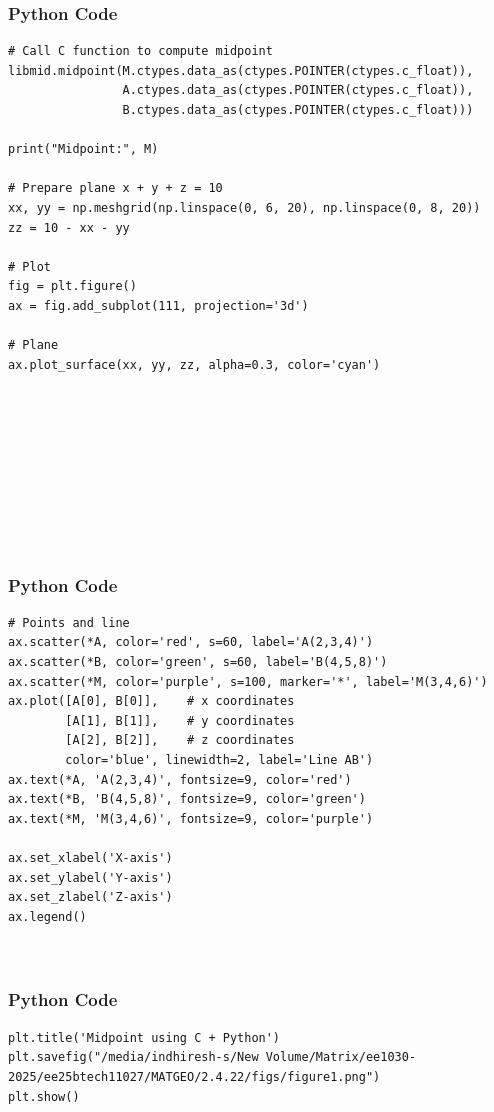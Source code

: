 \documentclass{beamer}
\begin{document}
\begin{frame}[fragile]
    \frametitle{Python Code}
    \begin{lstlisting}
# Call C function to compute midpoint
libmid.midpoint(M.ctypes.data_as(ctypes.POINTER(ctypes.c_float)),
                A.ctypes.data_as(ctypes.POINTER(ctypes.c_float)),
                B.ctypes.data_as(ctypes.POINTER(ctypes.c_float)))

print("Midpoint:", M)

# Prepare plane x + y + z = 10
xx, yy = np.meshgrid(np.linspace(0, 6, 20), np.linspace(0, 8, 20))
zz = 10 - xx - yy

# Plot
fig = plt.figure()
ax = fig.add_subplot(111, projection='3d')

# Plane
ax.plot_surface(xx, yy, zz, alpha=0.3, color='cyan')










    \end{lstlisting}
\end{frame}

\begin{frame}[fragile]
    \frametitle{Python Code}

    \begin{lstlisting}
# Points and line
ax.scatter(*A, color='red', s=60, label='A(2,3,4)')
ax.scatter(*B, color='green', s=60, label='B(4,5,8)')
ax.scatter(*M, color='purple', s=100, marker='*', label='M(3,4,6)')
ax.plot([A[0], B[0]],    # x coordinates
        [A[1], B[1]],    # y coordinates
        [A[2], B[2]],    # z coordinates
        color='blue', linewidth=2, label='Line AB')
ax.text(*A, 'A(2,3,4)', fontsize=9, color='red')
ax.text(*B, 'B(4,5,8)', fontsize=9, color='green')
ax.text(*M, 'M(3,4,6)', fontsize=9, color='purple')

ax.set_xlabel('X-axis')
ax.set_ylabel('Y-axis')
ax.set_zlabel('Z-axis')
ax.legend()



    \end{lstlisting}
\end{frame}
\begin{frame}[fragile]
    \frametitle{Python Code}

    \begin{lstlisting}
plt.title('Midpoint using C + Python')
plt.savefig("/media/indhiresh-s/New Volume/Matrix/ee1030-2025/ee25btech11027/MATGEO/2.4.22/figs/figure1.png")
plt.show()



    \end{lstlisting}
\end{frame}
\end{document}
